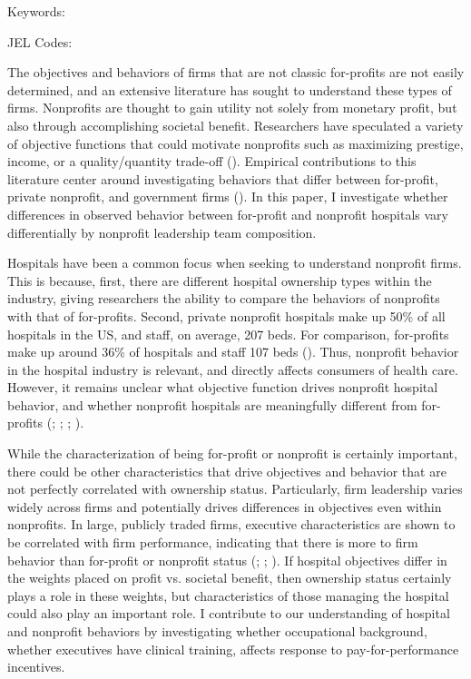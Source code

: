 \documentclass[12pt]{article}
\begin{document}
	
	
	
	\vspace{0.8in}
	
	\noindent Keywords: 
	
	\noindent JEL Codes: 
	
	\onehalfspacing
	
	\newpage

  The objectives and behaviors of firms that are not classic for-profits are not easily determined, and an extensive literature has sought to understand these types of firms. Nonprofits are thought to gain utility not solely from monetary profit, but also through accomplishing societal benefit. Researchers have speculated a variety of objective functions that could motivate nonprofits such as maximizing prestige, income, or a quality/quantity trade-off (\cite{steinberg1986revealed}). Empirical contributions to this literature center around investigating behaviors that differ between for-profit, private nonprofit, and government firms (\cite{sloan2000not}). In this paper, I investigate whether differences in observed behavior between for-profit and nonprofit hospitals vary differentially by nonprofit leadership team composition. 
  
  Hospitals have been a common focus when seeking to understand nonprofit firms. This is because, first, there are different hospital ownership types within the industry, giving researchers the ability to compare the behaviors of nonprofits with that of for-profits. Second, private nonprofit hospitals make up 50\% of all hospitals in the US, and staff, on average, 207 beds. For comparison, for-profits make up around 36\% of hospitals and staff 107 beds (\cite{ASPE_2023}). Thus, nonprofit behavior in the hospital industry is relevant, and directly affects consumers of health care. However, it remains unclear what objective function drives nonprofit hospital behavior, and whether nonprofit hospitals are meaningfully different from for-profits (\cite{sloan2000not}; \cite{erus2002inferring}; \cite{deneffe2002not}; \cite{horwitz2009hospital}). 
  
  While the characterization of being for-profit or nonprofit is certainly important, there could be other characteristics that drive objectives and behavior that are not perfectly correlated with ownership status. Particularly, firm leadership varies widely across firms and potentially drives differences in objectives even within nonprofits. In large, publicly traded firms, executive characteristics are shown to be correlated with firm performance, indicating that there is more to firm behavior than for-profit or nonprofit status (\cite{bertrand2003managing}; \cite{matsa2013female}; \cite{ahern2012changing}). If hospital objectives differ in the weights placed on profit vs. societal benefit, then ownership status certainly plays a role in these weights, but characteristics of those managing the hospital could also play an important role. I contribute to our understanding of hospital and nonprofit behaviors by investigating whether occupational background, whether executives have clinical training, affects response to pay-for-performance incentives.
\end{document}
